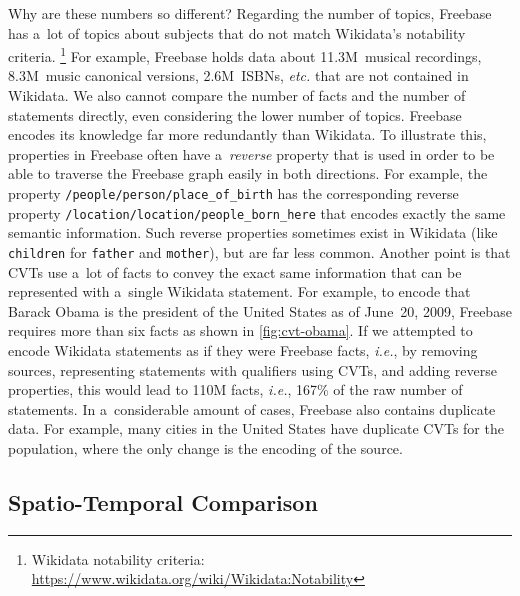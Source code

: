 \documentclass{sig-alternate}
\begin{document}
Why are these numbers so different?
Regarding the number of topics, Freebase has a~lot of topics about subjects
that do not match Wikidata's notability criteria.%
\footnote{Wikidata notability criteria:
\url{https://www.wikidata.org/wiki/Wikidata:Notability}}
For example, Freebase holds data about 11.3M~musical recordings,
8.3M~music canonical versions, 2.6M~ISBNs, \emph{etc.} that are not contained in Wikidata.
We also cannot compare the number of facts and the number of statements directly,
even considering the lower number of topics.
Freebase encodes its knowledge far more redundantly than Wikidata.
To illustrate this, properties in Freebase often have a~\emph{reverse} property
that is used in order to be able to traverse the Freebase graph easily in both directions.
For example, the property \texttt{/people/person/place\_of\_birth} has the corresponding
reverse property \texttt{/location/location/people\_born\_here}
that encodes exactly the same semantic information.
Such reverse properties sometimes exist in Wikidata
(like \texttt{children} for \texttt{father} and \texttt{mother}),
but are far less common.
Another point is that CVTs use a~lot of facts to convey the exact same information
that can be represented with a~single Wikidata statement.
For example, to encode that Barack Obama is the president of the United States as of June~20, 2009,
Freebase requires more than six facts as shown in \autoref{fig:cvt-obama}.
If we attempted to encode Wikidata statements as if they were Freebase facts, \emph{i.e.},
by removing sources, representing statements with qualifiers using CVTs,
and adding reverse properties, this would lead to 110M facts,
\emph{i.e.}, 167\% of the raw number of statements.
In a~considerable amount of cases, Freebase also contains duplicate data.
For example, many cities in the United States have duplicate CVTs for the population,
where the only change is the encoding of the source.

\subsection{Spatio-Temporal Comparison}
\end{document}
